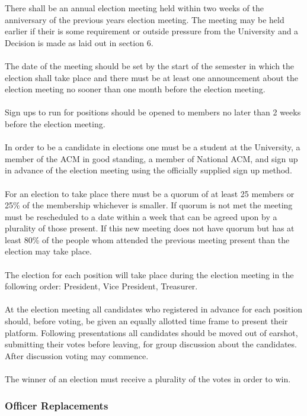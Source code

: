 \documentclass[12pt,titlepage]{article}
\begin{document}
There shall be an annual election meeting held within two weeks of the anniversary of the previous years election meeting. The meeting may be held earlier if their is some requirement or outside pressure from the University and a Decision is made as laid out in section 6.\\
\\
The date of the meeting should be set by the start of the semester in which the election shall take place and there must be at least one announcement about the election meeting no sooner than one month before the election meeting.\\
\\
Sign ups to run for positions should be opened to members no later than 2 weeks before the election meeting.\\
\\
In order to be a candidate in elections one must be a student at the University, a member of the ACM in good standing, a member of National ACM, and sign up in advance of the election meeting using the officially supplied sign up method.\\
\\
For an election to take place there must be a quorum of at least 25 members or 25\% of the membership whichever is smaller. If quorum is not met the meeting must be rescheduled to a date within a week that can be agreed upon by a plurality of those present. If this new meeting does not have quorum but has at least 80\% of the people whom attended the previous meeting present than the election may take place.\\
\\
The election for each position will take place during the election meeting in the following order: President, Vice President, Treasurer.\\
\\
At the election meeting all candidates who registered in advance for each position should, before voting, be given an equally allotted time frame to present their platform. Following presentations all candidates should be moved out of earshot, submitting their votes before leaving, for group discussion about the candidates. After discussion voting may commence.\\
\\
The winner of an election must receive a plurality of the votes in order to win.

\subsubsection{Officer Replacements}
\end{document}
